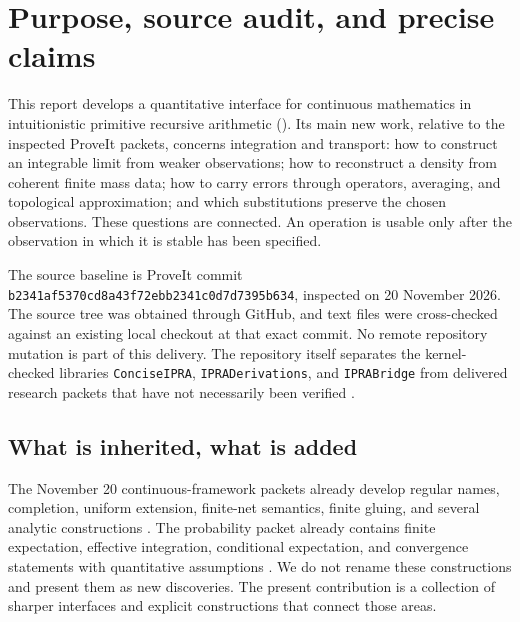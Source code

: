 \section{Purpose, source audit, and precise claims}
\label{sec:scope}

This report develops a quantitative interface for continuous mathematics in
intuitionistic primitive recursive arithmetic (\ipra). Its main new work,
relative to the inspected ProveIt packets, concerns integration and
transport: how to construct an integrable limit from weaker observations;
how to reconstruct a density from coherent finite mass data; how to carry
errors through operators, averaging, and topological approximation; and
which substitutions preserve the chosen observations. These questions are
connected. An operation is usable only after the observation in which it is
stable has been specified.

The source baseline is ProveIt commit
\texttt{b2341af5370cd8a43f72ebb2341c0d7d7395b634}, inspected on
20 November 2026. The source tree was obtained through GitHub, and text
files were cross-checked against an existing local checkout at that exact
commit. No remote repository mutation is part of this delivery.
The repository itself separates the kernel-checked libraries
\texttt{ConciseIPRA}, \texttt{IPRADerivations}, and \texttt{IPRABridge}
from delivered research packets that have not necessarily been verified
\cite{repo-main,repo-unification}.

\subsection{What is inherited, what is added}

The November 20 continuous-framework packets already develop regular
names, completion, uniform extension, finite-net semantics, finite
gluing, and several analytic constructions
\cite{repo-continuous,repo-continuous-two}. The probability packet already
contains finite expectation, effective integration, conditional expectation,
and convergence statements with quantitative assumptions
\cite{repo-expectation}. We do not rename these constructions and present
them as new discoveries. The present contribution is a collection of
sharper interfaces and explicit constructions that connect those areas.

